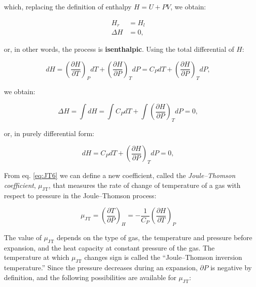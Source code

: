 \documentclass[
  9pt,
]{extbook}
\theoremstyle{definition}
\theoremstyle{definition}
\theoremstyle{definition}
\theoremstyle{remark}
\begin{document}
which, replacing the definition of enthalpy \(H=U+PV\), we obtain:

\begin{equation}
\begin{aligned}
H_r &=H_l \\
\Delta H &=0,
\end{aligned}
\label{eq:JT4}
\end{equation}

or, in other words, the process is \textbf{isenthalpic}. Using the total differential of \(H\):

\begin{equation}
dH=\left(\frac{\partial H}{\partial T} \right)_P dT + \left(\frac{\partial H}{\partial P} \right)_T dP = C_P dT + \left(\frac{\partial H}{\partial P} \right)_T dP,
\label{eq:JT5}
\end{equation}

we obtain:

\begin{equation}
\Delta H=\int dH = \int C_P dT + \int \left(\frac{\partial H}{\partial P} \right)_T dP =0,
\label{eq:JT6b}
\end{equation}

or, in purely differential form:

\begin{equation}
dH = C_P dT + \left(\frac{\partial H}{\partial P} \right)_T dP =0,
\label{eq:JT6}
\end{equation}

From eq. \eqref{eq:JT6} we can define a new coefficient, called the \emph{Joule--Thomson coefficient}, \(\mu_{\mathrm{JT}}\), that measures the rate of change of temperature of a gas with respect to pressure in the Joule--Thomson process:

\begin{equation}
\mu_{\mathrm{JT}}=\left( \frac{\partial T}{\partial P} \right)_H=-\frac{1}{C_P} \left( \frac{\partial H}{\partial T} \right)_P
\label{eq:muJT}
\end{equation}

The value of \(\mu_{\mathrm{JT}}\) depends on the type of gas, the temperature and pressure before expansion, and the heat capacity at constant pressure of the gas. The temperature at which \(\mu_{\mathrm{JT}}\) changes sign is called the ``Joule--Thomson inversion temperature.'' Since the pressure decreases during an expansion, \(\partial P\) is negative by definition, and the following possibilities are available for \(\mu_{\mathrm{JT}}\):
\end{document}
